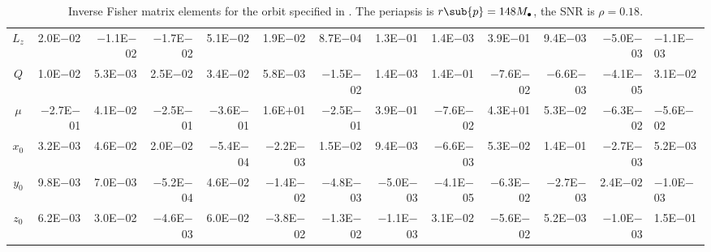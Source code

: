 \begin{sidewaystable}[htbp]
\begin{tabular}{crrrrrrrrrrr}
$L_z$ & 2.0E$-$02 & $-$1.1E$-$02 & $-$1.7E$-$02 & 5.1E$-$02 & 1.9E$-$02 & 8.7E$-$04 & 1.3E$-$01 & 1.4E$-$03 & 3.9E$-$01 & 9.4E$-$03 & $-$5.0E$-$03 & $-$1.1E$-$03 \\
$Q$ & 1.0E$-$02 & 5.3E$-$03 & 2.5E$-$02 & 3.4E$-$02 & 5.8E$-$03 & $-$1.5E$-$02 & 1.4E$-$03 & 1.4E$-$01 & $-$7.6E$-$02 & $-$6.6E$-$03 & $-$4.1E$-$05 & 3.1E$-$02 \\
$\mu$ & $-$2.7E$-$01 & 4.1E$-$02 & $-$2.5E$-$01 & $-$3.6E$-$01 & 1.6E$+$01 & $-$2.5E$-$01 & 3.9E$-$01 & $-$7.6E$-$02 & 4.3E$+$01 & 5.3E$-$02 & $-$6.3E$-$02 & $-$5.6E$-$02 \\
$x_0$ & 3.2E$-$03 & 4.6E$-$02 & 2.0E$-$02 & $-$5.4E$-$04 & $-$2.2E$-$03 & 1.5E$-$02 & 9.4E$-$03 & $-$6.6E$-$03 & 5.3E$-$02 & 1.4E$-$01 & $-$2.7E$-$03 & 5.2E$-$03 \\
$y_0$ & 9.8E$-$03 & 7.0E$-$03 & $-$5.2E$-$04 & 4.6E$-$02 & $-$1.4E$-$02 & $-$4.8E$-$03 & $-$5.0E$-$03 & $-$4.1E$-$05 & $-$6.3E$-$02 & $-$2.7E$-$03 & 2.4E$-$02 & $-$1.0E$-$03 \\
$z_0$ & 6.2E$-$03 & 3.0E$-$02 & $-$4.6E$-$03 & 6.0E$-$02 & $-$3.8E$-$02 & $-$1.3E$-$02 & $-$1.1E$-$03 & 3.1E$-$02 & $-$5.6E$-$02 & 5.2E$-$03 & $-$1.0E$-$03 & 1.5E$-$01 \\
\bottomrule
\end{tabular}
\caption{Inverse Fisher matrix elements for the orbit specified in . The periapsis is $r\sub{p} = 148 M_\bullet$, the SNR is $\rho = 0.18$.}
\label{tab:Fisher_7}
\end{sidewaystable}
